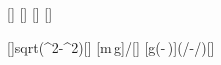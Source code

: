 [\kg]
[\meter]
[\meter]
[\mpss]

[]{sqrt(\lPX^2-\hPX^2)}[\meter]
[m\,g\cdot{}]{\mX*\gX*\bPX/\lPX}[\newton]
[g\cdot\left(-\mu\,\right)]{\gX*(\hPX/\lPX-\muGX*\bPX/\lPX)}[\mpss]
